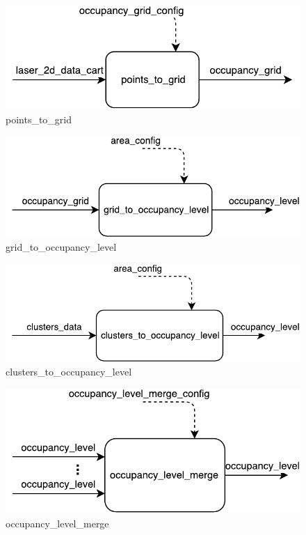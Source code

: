 \begin{description}
\begin{figure}[ht!]
\centering
\includegraphics[scale=0.7]{fig/3/points_to_grid.pdf}
\caption{points\_to\_grid}
\label{points_to_grid}
\end{figure}

\begin{figure}[ht!]
\centering
\includegraphics[scale=0.7]{fig/3/grid_to_occupancy_level.pdf}
\caption{grid\_to\_occupancy\_level}
\label{grid_to_occupancy_level}
\end{figure}

\begin{figure}[ht!]
\centering
\includegraphics[scale=0.7]{fig/3/clusters_to_occupancy_level.pdf}
\caption{clusters\_to\_occupancy\_level}
\label{clusters_to_occupancy_level}
\end{figure}

\begin{figure}[ht!]
\centering
\includegraphics[scale=0.7]{fig/3/occupancy_level_merge.pdf}
\caption{occupancy\_level\_merge}
\label{occupancy_level_merge}
\end{figure}


\end{description}
